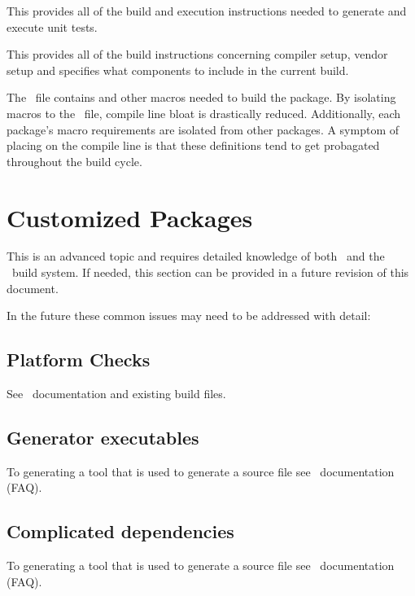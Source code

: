 \begin{description}
\begin{table}
\begin{center}
    \end{center}
  \end{table}
\item[\vble{pkg}/\comp{test}/\comp{CMakeLists}] This
   provides all of the build and execution instructions needed to generate and execute unit tests. 
\item[\comp{src}/\comp{CMakeLists}] This
   provides all of the build instructions concerning compiler setup, vendor setup and specifies what components to include in the current build.
\item[\comp{config.h.in}] The \confhin\ file 
  contains  and other  macros needed to build 
  the package.  By isolating macros to the \confhin\ file, compile
  line bloat is drastically reduced.  Additionally, each package's
  macro requirements are isolated from other packages.  A symptom of
  placing  on the compile line is that these
  definitions tend to get probagated throughout the build cycle.
\end{description}


\section{Customized Packages}
\label{sec:customize}

This is an advanced topic and requires detailed knowledge of both \cmake\ and the \draco\ build system.  If needed, this section can be provided in a future revision of this document.

In the future these common issues may need to be addressed with detail:

\subsection{Platform Checks}
\label{sec:platformcheck}

See \cmake\ documentation and existing build files.

\subsection{Generator executables}
\label{sec:generator_executable}
To generating a tool that is used to generate a source file see \cmake\ documentation (FAQ).

\subsection{Complicated dependencies}
\label{sec:complicated_deps}
To generating a tool that is used to generate a source file see \cmake\ documentation (FAQ).




